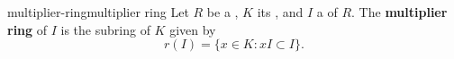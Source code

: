 \begin{topic}{multiplier-ring}{multiplier ring}
    Let $R$ be a , $K$ its , and $I$ a  of $R$. The \textbf{multiplier ring} of $I$ is the subring of $K$ given by
    \[ r(I) = \{ x \in K : x I \subset I \} . \]
\end{topic}
